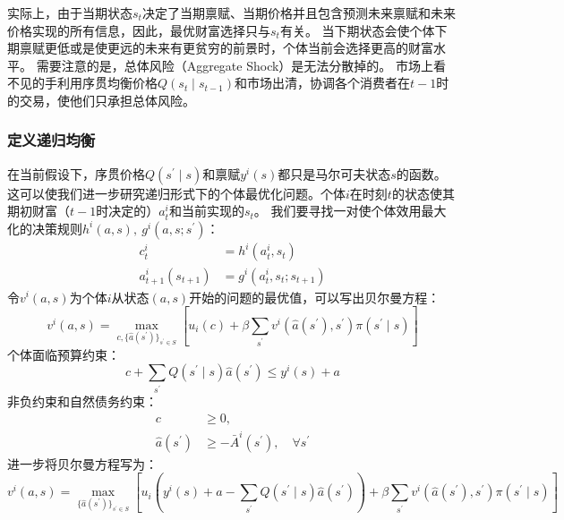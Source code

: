实际上，由于当期状态$s_t$决定了当期禀赋、当期价格并且包含预测未来禀赋和未来价格实现的所有信息，因此，最优财富选择只与$s_t$有关。
当下期状态会使个体下期禀赋更低或是使更远的未来有更贫穷的前景时，个体当前会选择更高的财富水平。
需要注意的是，总体风险（Aggregate Shock）是无法分散掉的。
市场上看不见的手利用序贯均衡价格$Q\left(s_t\mid s_{t-1}\right)$和市场出清，协调各个消费者在$t-1$时的交易，使他们只承担总体风险。


\subsubsection{定义递归均衡}

在当前假设下，序贯价格$Q\left(s^{\prime}\mid s\right)$和禀赋$y^i\left(s\right)$都只是马尔可夫状态$s$的函数。
这可以使我们进一步研究递归形式下的个体最优化问题。个体$i$在时刻$t$的状态使其期初财富（$t-1$时决定的）$a_t^i$和当前实现的$s_t$。
我们要寻找一对使个体效用最大化的决策规则$h^i\left(a,s\right),~ g^i\left(a,s;s^{\prime}\right)$：
\begin{subequations}
    \begin{align}
        c_t^i & =h^i\left(a_t^i, s_t\right) \\
        a_{t+1}^i\left(s_{t+1}\right) & =g^i\left(a_t^i, s_t;s_{t+1}\right)
    \end{align}
\end{subequations}
令$v^i\left(a,s\right)$为个体$i$从状态$\left(a,s\right)$开始的问题的最优值，可以写出贝尔曼方程：
\begin{equation}    \label{eq-rce-bellman}
    v^i(a, s)=\max_{c, \{\hat{a}\left(s^{\prime}\right)\}_{s^\prime\in S}}
        \left[u_i(c)+
        \beta\sum_{s^{\prime}}v^i\left(\hat{a}\left(s^{\prime}\right), s^{\prime}\right) \pi\left(s^{\prime}\mid s\right)\right]
\end{equation}
个体面临预算约束：
\begin{equation}    \label{eq-rce-bc}
    c+\sum_{s^{\prime}} Q\left(s^{\prime}\mid s\right) \hat{a}\left(s^{\prime}\right) \leq y^i(s)+a
\end{equation}
非负约束和自然债务约束：
\begin{subequations}
    \begin{align}
        c & \geq 0, \\
        \hat{a}\left(s^{\prime}\right) & \geq -\bar{A}^i\left(s^{\prime}\right), \quad \forall s^{\prime}
    \end{align}
\end{subequations}
进一步将贝尔曼方程写为：
\begin{equation*}
    v^i(a, s) = \max_{\{\hat{a}\left(s^{\prime}\right)\}_{s^\prime\in S}}
        \left[u_i\left(y^i\left(s\right)+a-\sum_{s^{\prime}}Q\left(s^{\prime}\mid s\right)\hat{a}\left(s^{\prime}\right)\right)+      
        \beta\sum_{s^{\prime}}v^i\left(\hat{a}\left(s^{\prime}\right), s^{\prime}\right) \pi\left(s^{\prime}\mid s\right)\right]
\end{equation*}
